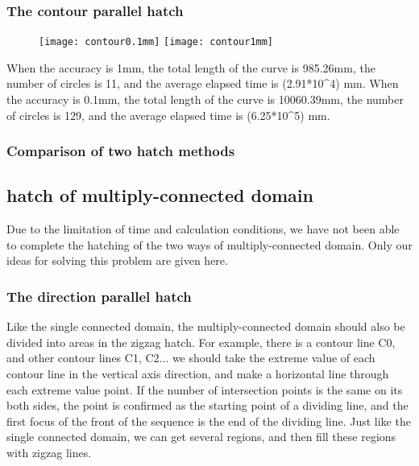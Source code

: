 \documentclass{apmcmthesis}
\begin{document}
\subsubsection{The contour parallel hatch}


\begin{figure}[!ht]
  \centering
  \texttt{[image: contour0.1mm]} \quad \texttt{[image: contour1mm]}
  \caption{}
  \caption{}
\end{figure}

When the accuracy is 1mm, the total length of the curve is 985.26mm, the number of circles is 11, and the average elapsed time is (2.91*10^4) mm. When the accuracy is 0.1mm, the total length of the curve is 10060.39mm, the number of circles is 129, and the average elapsed time is (6.25*10^5) mm.


\subsubsection{Comparison of two hatch methods}

\subsection{hatch of multiply-connected domain}

Due to the limitation of time and calculation conditions, we have not been able to complete the hatching of the two ways of multiply-connected domain. Only our ideas for solving this problem are given here.

\subsubsection{The direction parallel hatch}

Like the single connected domain, the multiply-connected domain should also be divided into areas in the zigzag hatch. For example, there is a contour line C0, and other contour lines C1, C2... we should take the extreme value of each contour line in the vertical axis direction, and make a horizontal line through each extreme value point. If the number of intersection points is the same on its both sides, the point is confirmed as the starting point of a dividing line, and the first focus of the front of the sequence is the end of the dividing line. Just like the single connected domain, we can get several regions, and then fill these regions with zigzag lines.
\end{document}
